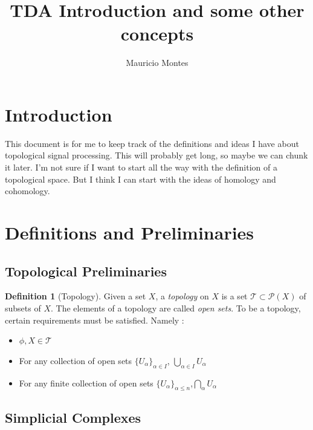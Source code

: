 \documentclass[12pt]{article}
\author{Mauricio Montes}
\title{TDA Introduction and some other concepts}
\theoremstyle{plain}
\theoremstyle{definition}
\newtheorem{definition}[thm]{Definition}
\begin{document}
\maketitle

\section{Introduction}

This document is for me to keep track of the definitions and ideas I have about topological signal
processing. This will probably get long, so maybe we can chunk it later. I'm not sure if I want to
start all the way with the definition of a topological space. But I think I can start with the ideas
of homology and cohomology. 


\section{Definitions and Preliminaries}

\subsection{Topological Preliminaries}

\begin{definition}[Topology] Given a set $X$, a \textit{topology} on $X$ is a set $\mathcal{T} \subset \mathcal{P}(X)$ of subsets
of $X$. The elements of a topology are called \textit{open sets}. To be a topology, certain
requirements must be satisfied. Namely :

\begin{itemize}

  \item $\phi, X \in \mathcal{T}$

  \item For any collection of open sets $\{U_\alpha \}_{\alpha \in I}$, $\bigcup_{\alpha \in I} U_\alpha$

  \item For any finite collection of open sets $\{U_\alpha\}_{\alpha \leq n}$,$\bigcap_{\alpha} U_\alpha$
    
\end{itemize}

\end{definition}

\subsection{Simplicial Complexes}
\end{document}
